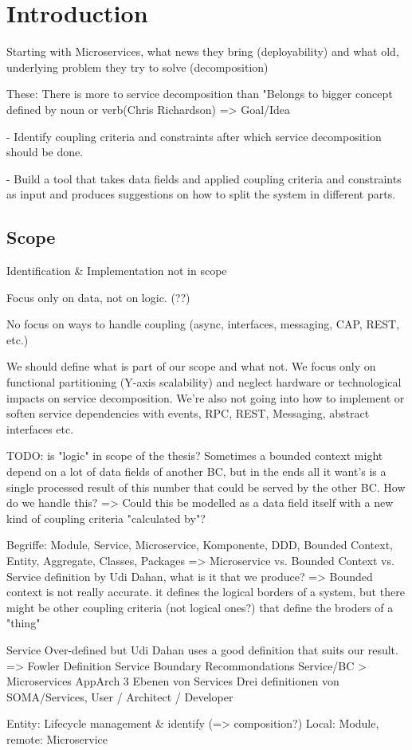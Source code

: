 \chapter{Introduction}

Starting with Microservices, what news they bring (deployability) and what old, underlying problem they try to solve (decomposition)

These: There is more to service decomposition than "Belongs to bigger concept defined by noun or verb(Chris Richardson)
=> Goal/Idea

- Identify coupling criteria and constraints after which service 
decomposition should be done. 

- Build a tool that takes data fields and applied coupling criteria and constraints as input and produces suggestions on how to split the system in different parts. 


\section{Scope}

Identification \& Implementation not in scope

Focus only on data, not on logic. (??)

No focus on ways to handle coupling (async, interfaces, messaging, CAP, REST, etc.)


We should define what is part of our scope and what not. We focus only on functional partitioning (Y-axis scalability) and neglect hardware or technological impacts on service decomposition. We’re also not going into how to implement or soften service dependencies with events, RPC, REST, Messaging, abstract interfaces etc. 

TODO: is "logic" in scope of the thesis? Sometimes a bounded context might depend on a lot of data fields of another BC, but in the ends all it want's is a single processed result of this number that could be served by the other BC. How do we handle this? => Could this be modelled as a data field itself with a new kind of coupling criteria "calculated by"?

Begriffe: Module, Service, Microservice, Komponente, DDD, Bounded Context, Entity, Aggregate, Classes, Packages
=> Microservice vs. Bounded Context vs. Service definition by Udi Dahan, what is it that we produce?
=> Bounded context is not really accurate. it defines the logical borders of a system, but there might be other coupling criteria (not logical ones?) that define the broders of a "thing"

Service
Over-defined but Udi Dahan uses a good definition that suits our result. 
=> Fowler Definition 
Service Boundary Recommondations
Service/BC > Microservices 
AppArch 3 Ebenen von Services
Drei definitionen von SOMA/Services, User / Architect / Developer


Entity: Lifecycle management \& identify (=> composition?)
Local: Module, remote: Microservice
